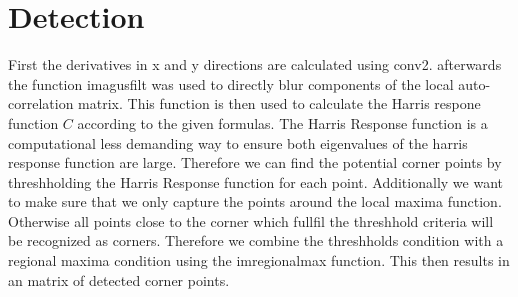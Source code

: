 \documentclass[12pt]{article}
\begin{document}
\maketitle


\section{Detection}
First the derivatives in x and y directions are calculated using conv2. afterwards the function imagusfilt was used to directly blur components of the local auto-correlation matrix. This function is then used to calculate the Harris respone function $C$ according to the given formulas. The Harris Response function is a computational less demanding way to ensure both eigenvalues of the harris response function are large. 
Therefore we can find the potential corner points by threshholding the Harris Response function for each point. 
Additionally we want to make sure that we only capture the points around the local maxima function. Otherwise all points close to the corner which fullfil the threshhold criteria will be recognized as corners. 
Therefore we combine the threshholds condition with a regional maxima condition using the imregionalmax function. 
This then results in an matrix of detected corner points. 
\vspace{5mm}
\newline
\end{document}
